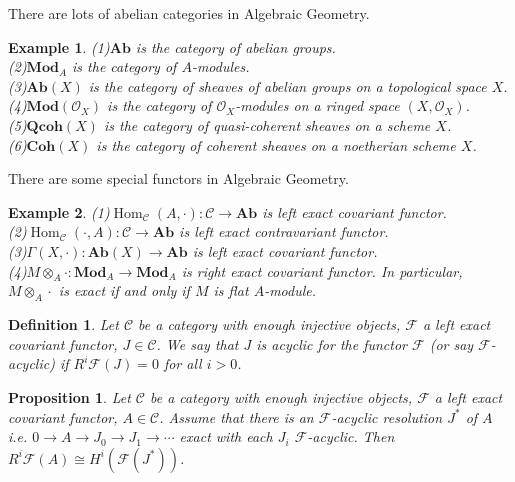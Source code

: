 \documentclass{ctexart}
\newtheorem{definition}{Definition}[section]
\newtheorem{proposition}{Proposition}[section]
\newtheorem{example}{Example}[section]
\renewcommand{\hom}{\operatorname{Hom}}
\newcommand{\abeliangroups}{\mathbf{Ab}}
\newcommand{\module}{\mathbf{Mod}}
\newcommand{\coherent}{\mathbf{Coh}}
\newcommand{\quasicoherent}{\mathbf{Qcoh}}
\begin{document}
There are lots of abelian categories in Algebraic Geometry.
\begin{example}
    (1)$\abeliangroups$ is the category of abelian groups. \\
    (2)$\module_{A}$ is the category of $A$-modules. \\
    (3)$\abeliangroups (X)$ is the category of sheaves of abelian groups on a topological space $X$. \\
    (4)$\module (\mathcal{O}_{X})$ is the category of $\mathcal{O}_{X}$-modules on a ringed space $(X, \mathcal{O}_{X})$. \\
    (5)$\quasicoherent (X)$ is the category of quasi-coherent sheaves on a scheme $X$. \\
    (6)$\coherent (X)$ is the category of coherent sheaves on a noetherian scheme $X$.
\end{example}
There are some special functors in Algebraic Geometry.
\begin{example}
    (1)$\hom_{\mathcal{C}}(A, \cdot): \mathcal{C} \longrightarrow \abeliangroups$ is left exact covariant functor. \\
    (2)$\hom_{\mathcal{C}}(\cdot, A): \mathcal{C} \longrightarrow \abeliangroups$ is left exact contravariant functor. \\
    (3)$\Gamma(X, \cdot): \abeliangroups (X) \longrightarrow \abeliangroups$ is left exact covariant functor. \\
    (4)$M \otimes_{A} \cdot: \module_{A} \longrightarrow \module_{A}$ is right exact covariant functor.
    In particular, $M \otimes_{A} \cdot$ is exact if and only if $M$ is flat $A$-module. 
\end{example}
\begin{definition}
    Let $\mathcal{C}$ be a category with enough injective objects, $\mathcal{F}$ a left exact covariant functor, $J\in \mathcal{C}$.
    We say that $J$ is acyclic for the functor $\mathcal{F}$ (or say $\mathcal{F}$-acyclic) if $R^{i}\mathcal{F}(J) = 0$ for all $i > 0$.
\end{definition}
\begin{proposition}
    Let $\mathcal{C}$ be a category with enough injective objects, $\mathcal{F}$ a left exact covariant functor, $A\in \mathcal{C}$.
    Assume that there is an $\mathcal{F}$-acyclic resolution $J^{\ast}$ of $A$ i.e. $0 \longrightarrow A \longrightarrow J_{0} \longrightarrow J_{1} \longrightarrow \cdots$ exact with each $J_{i}$ $\mathcal{F}$-acyclic.
    Then $R^{i}\mathcal{F}(A) \cong H^{i}(\mathcal{F}(J^{\ast}))$.
    \label{Proposition 2.1}
\end{proposition}
\end{document}
